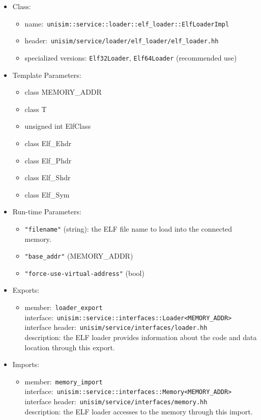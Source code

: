 \begin{itemize}
\item Class:
	\begin{itemize}
		\item name:~\texttt{unisim::service::loader::elf\_loader::ElfLoaderImpl}\\
		\item header:~\texttt{unisim/service/loader/elf\_loader/elf\_loader.hh}
		\item specialized versions: \texttt{Elf32Loader}, \texttt{Elf64Loader} (recommended use)
	\end{itemize}
\item Template Parameters:
	\begin{itemize}
		\item class MEMORY\_ADDR
		\item class T
		\item unsigned int ElfClass
		\item class Elf\_Ehdr
		\item class Elf\_Phdr
		\item class Elf\_Shdr
		\item class Elf\_Sym
	\end{itemize}
\item Run-time Parameters:
	\begin{itemize}
		\item \texttt{"filename"} (string): the ELF file name to load into the connected memory.
		\item \texttt{"base\_addr"} (MEMORY\_ADDR)
		\item \texttt{"force-use-virtual-address"} (bool)
	\end{itemize}
\item Exports:
	\begin{itemize}
		\item member:~\texttt{loader\_export}\\
		interface:~\texttt{unisim::service::interfaces::Loader<MEMORY\_ADDR>}\\
		interface header:~\texttt{unisim/service/interfaces/loader.hh}\\
		description: the ELF loader provides information about the code and data location through this export.
	\end{itemize}
\item Imports:
	\begin{itemize}
		\item member:~\texttt{memory\_import}\\
		interface:~\texttt{unisim::service::interfaces::Memory<MEMORY\_ADDR>}\\
		interface header:~\texttt{unisim/service/interfaces/memory.hh}\\
		description: the ELF loader accesses to the memory through this import.


\end{itemize}
\end{itemize}
